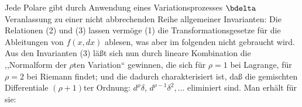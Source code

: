 Jede Polare gibt durch Anwendung eines Variationsprozesses \(\bdelta\)
Veranlassung zu einer nicht abbrechenden Reihe allgemeiner Invarianten:
Die Relationen (2) und (3) lassen vermöge (1) die Transformationsgesetze
für die Ableitungen von \(f(x,dx)\) ablesen, was aber im folgenden
nicht gebraucht wird. Aus den Invarianten (3) läßt sich nun durch
lineare Kombination die ,,Normalform der \(\rho\)ten Variation``
gewinnen, die sich für \(\rho=1\) bei Lagrange, für \(\rho=2\) bei
Riemann findet; und die dadurch charakterisiert ist, daß die gemischten
Differentiale \((\rho+1)\)ter Ordnung: \(d^\rho\delta\),
\(d^{\rho-1}\delta^2,\ldots\) eliminiert sind. Man erhält für sie:

